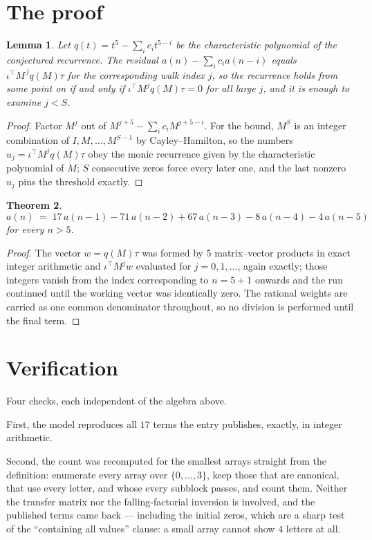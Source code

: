 \documentclass[11pt,a4paper]{article}
\theoremstyle{plain}
\newtheorem{theorem}{Theorem}
\newtheorem{lemma}[theorem]{Lemma}
\theoremstyle{definition}
\begin{document}
\section{The proof}

\begin{lemma}\label{lem:crit}
Let $q(t)=t^{5}-\sum_i c_it^{5-i}$ be the characteristic polynomial of the
conjectured recurrence. The residual $a(n)-\sum_ic_ia(n-i)$ equals
$\iota^{\!\top}M^{\,j}q(M)\tau$ for the corresponding walk index $j$, so the recurrence
holds from some point on if and only if $\iota^{\!\top}M^{j}q(M)\tau=0$ for all large $j$,
and it is enough to examine $j<S$.
\end{lemma}

\begin{proof}
Factor $M^{j}$ out of $M^{j+5}-\sum_ic_iM^{j+5-i}$. For the bound, $M^{S}$
is an integer combination of $I,M,\dots,M^{S-1}$ by Cayley--Hamilton, so the numbers
$u_j=\iota^{\!\top}M^{j}q(M)\tau$ obey the monic recurrence given by the characteristic
polynomial of $M$; $S$ consecutive zeros force every later one, and the last nonzero $u_j$
pins the threshold exactly.
\end{proof}

\begin{theorem}
\[
a(n)\;=\;17\,a(n-1) - 71\,a(n-2) + 67\,a(n-3) - 8\,a(n-4) - 4\,a(n-5)
\]
for every $n>5$.
\end{theorem}

\begin{proof}
The vector $w=q(M)\tau$ was formed by $5$ matrix--vector products in exact integer
arithmetic and $\iota^{\!\top}M^{j}w$ evaluated for $j=0,1,\dots$, again exactly; those
integers vanish from the index corresponding to $n=5+1$ onwards and the run continued
until the working vector was identically zero. The rational weights are carried as one common
denominator throughout, so no division is performed until the final term.
\end{proof}

\section{Verification}

Four checks, each independent of the algebra above.

First, the model reproduces all $17$ terms the entry publishes, exactly, in integer
arithmetic.

Second, the count was recomputed for the smallest arrays straight from the definition:
enumerate every array over $\{0,\dots,3\}$, keep those that are canonical, that use every
letter, and whose every subblock passes, and count them. Neither the transfer matrix nor the
falling-factorial inversion is involved, and the published terms came back --- including the
initial zeros, which are a sharp test of the ``containing all values'' clause: a small array
cannot show $4$ letters at all.
\end{document}
